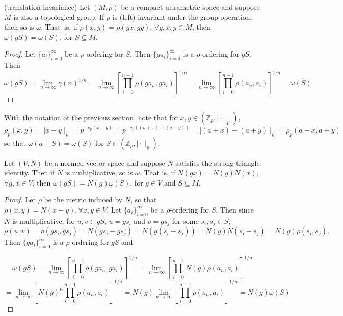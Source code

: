 \begin{proposition*}
	(translation invariance) Let $(M, \rho)$ be a compact ultrametric space and suppose $M$ is also a topological group. If $\rho$ is (left) invariant under the group operation, then so is $\omega$. That\ is, if $\rho(x,y)=\rho(gx,gy)$, $ \forall g,x,y \in M$, then $\omega(gS)=\omega(S)$, for $S \subseteq M$.	
\end{proposition*}

\begin{proof}
	Let $\{a_i\}_{i=0}^\infty$ be a $\rho$-ordering for $S$. Then $\{ga_i\}_{i=0}^\infty$ is a $\rho$-ordering for $gS$. Then $$\omega(gS) = \lim_{n\to\infty} \gamma(n)^{1/n} =  \lim_{n\to\infty} [\prod_{i=0}^{n-1} \rho(ga_n,ga_i)]^{1/n} = \lim_{n\to\infty} [\prod_{i=0}^{n-1} \rho(a_n,a_i)]^{1/n}	 = \omega(S)$$
\end{proof}	

\begin{example}
	With the notation of the previous section, note that for $x,y \in (\mathbb{Z}_p, \mid \cdot \mid_p)$, $\rho_p(x,y) = \mid x - y \mid_p = p^{-\nu_p(x-y)} = p^{-\nu_p((a+x)-(a+y))} =  \mid (a+x) - (a+y) \mid_p = \rho_p(a+x,a+y)$ so that $\omega(a+S) = \omega(S)$ for $S \in (\mathbb{Z}_p, \mid \cdot \mid_p)$.
\end{example}

\begin{proposition*}
	Let $(V, N)$ be a normed vector space and suppose $N$ satisfies the strong triangle identity. Then if $N$ is multiplicative, so is $\omega$. That is, if $N(gx)=N(g)N(x)$,$\forall g,x \in V$, then $\omega(gS) = N(g)  \omega(S)$, for $g \in V$ and $S \subseteq M$. 
\end{proposition*}

\begin{proof}
	Let $\rho$ be the metric induced by $N$, so that $\rho(x,y) = N(x-y), \forall x,y \in V$. Let $\{a_i\}_{i=0}^\infty$ be a $\rho$-ordering for $S$. Then since $N$ is multiplicative, for $u, v \in gS$, $u=gs_i$ and $v=gs_j$ for some $s_i, s_j \in S$,  $$\rho(u, v) = \rho(gs_i, gs_j) =N(gs_i - gs_j) = N(g(s_i - s_j)) = N(g)N(s_i - s_j) = N(g)\rho(s_i,s_j).$$
	Then $\{ga_i\}_{i=0}^\infty$ is a $\rho$-ordering for $gS$ and 
	
	$$\omega(gS) = \lim_{n\to\infty} [\prod_{i=0}^{n-1} \rho(ga_n,ga_i)]^{1/n} 
	= \lim_{n\to\infty} [\prod_{i=0}^{n-1} N(g)\rho(a_n,a_i)]^{1/n} $$
	$$= \lim_{n\to\infty} [N(g)^n\prod_{i=0}^{n-1} \rho(a_n,a_i)]^{1/n} = N(g) \lim_{n\to\infty} [\prod_{i=0}^{n-1} \rho(a_n,a_i)]^{1/n} = N(g) \omega(S)$$
\end{proof}


